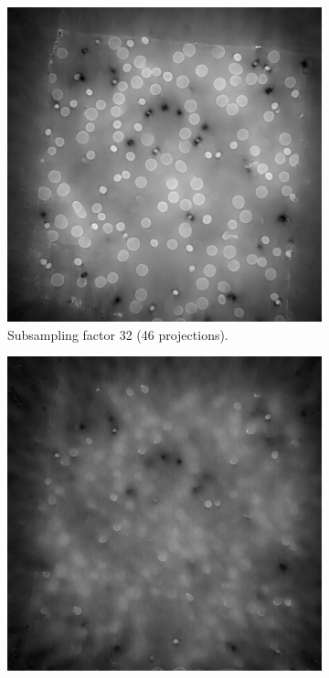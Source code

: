 \begin{figure}
  \begin{subfigure}[t]{.45\textwidth}
    \centering
    \includegraphics[width=\linewidth]{figures/ns32it100000itd4mse035logcosh3.png}
    \caption{Subsampling factor 32 (46 projections). }
  \end{subfigure}
  \hfill
  \begin{subfigure}[t]{.45\textwidth}
    \centering
    \includegraphics[width=\linewidth]{figures/ns48it100000itd4mse035logcosh3.png}

\end{subfigure}
\end{figure}
